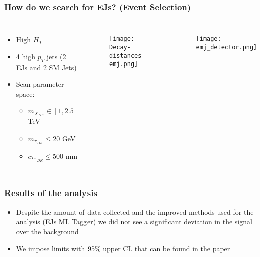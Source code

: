 \documentclass[aspectratio=1610]{beamer}
\begin{document}
\begin{frame}
	\frametitle{How do we search for EJs? (Event Selection)}
	\begin{columns}
		\begin{itemize}
			\item High $H_T$
			\item 4 high $p_T$ jets (2 EJs and 2 SM Jets)
			\item Scan parameter space:
			      \begin{itemize}
				      \item $m_{X_{DK}} \in [1,2.5] $ TeV
				      \item $m_{\pi_{DK}} \leq 20$ GeV
				      \item $c\tau_{\pi_{DK}} \leq 500$ mm
			      \end{itemize}
		\end{itemize}

		\begin{figure}
			\centering
			\texttt{[image: Decay-distances-emj.png]}
		\end{figure}


		\begin{figure}
			\centering
			\texttt{[image: emj\_detector.png]}
		\end{figure}


	\end{columns}

\end{frame}


\begin{frame}
	\frametitle{Results of the analysis}
	\begin{itemize}
		\item Despite the amount of data collected and the improved methods used for the analysis (EJs ML Tagger) we did not see a significant deviation in the signal over the background
		\item We impose limits with 95\% upper CL that can be found in the \href{https://doi.org/10.48550/arXiv.2403.01556}{paper}
	\end{itemize}


\end{frame}
\end{document}
